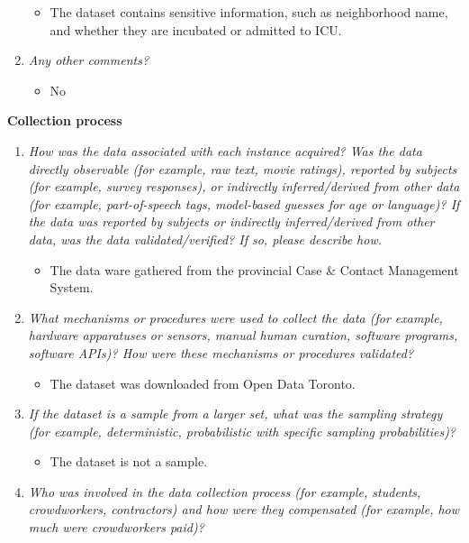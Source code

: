 \documentclass[
]{article}
\providecommand{\tightlist}{%
  \setlength{\itemsep}{0pt}\setlength{\parskip}{0pt}}
\begin{document}
\begin{enumerate}
  \begin{itemize}
  \tightlist
  \item
    The dataset contains sensitive information, such as neighborhood name, and whether they are incubated or admitted to ICU.
  \end{itemize}
\item
  \emph{Any other comments?}

  \begin{itemize}
  \tightlist
  \item
    No
  \end{itemize}
\end{enumerate}

\textbf{Collection process}

\begin{enumerate}
\def\labelenumi{\arabic{enumi}.}
\tightlist
\item
  \emph{How was the data associated with each instance acquired? Was the data directly observable (for example, raw text, movie ratings), reported by subjects (for example, survey responses), or indirectly inferred/derived from other data (for example, part-of-speech tags, model-based guesses for age or language)? If the data was reported by subjects or indirectly inferred/derived from other data, was the data validated/verified? If so, please describe how.}

  \begin{itemize}
  \tightlist
  \item
    The data ware gathered from the provincial Case \& Contact Management System.
  \end{itemize}
\item
  \emph{What mechanisms or procedures were used to collect the data (for example, hardware apparatuses or sensors, manual human curation, software programs, software APIs)? How were these mechanisms or procedures validated?}

  \begin{itemize}
  \tightlist
  \item
    The dataset was downloaded from Open Data Toronto.
  \end{itemize}
\item
  \emph{If the dataset is a sample from a larger set, what was the sampling strategy (for example, deterministic, probabilistic with specific sampling probabilities)?}

  \begin{itemize}
  \tightlist
  \item
    The dataset is not a sample.
  \end{itemize}
\item
  \emph{Who was involved in the data collection process (for example, students, crowdworkers, contractors) and how were they compensated (for example, how much were crowdworkers paid)?}


\end{enumerate}
\end{document}

